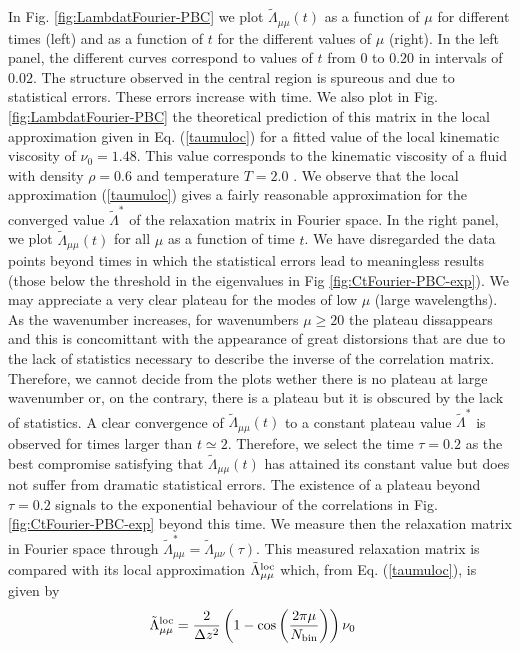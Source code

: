 \documentclass[b5paper,openright,11pt]{book}
\newcommand{\Pendiente}[1]{{\color{green}#1}} %
\begin{document}
In       Fig.         \ref{fig:LambdatFourier-PBC}       we       plot
$\tilde{\Lambda}_{\mu\mu}(t)$  as a  function of  $\mu$ for  different
times (left) and as a function of $t$ for the different values of $\mu$
(right). In the left panel,  the different curves correspond to values
of  $t$ from  $0$ to  $0.20$ in  intervals of  $0.02$.  The  structure
observed  in the  central region  is spureous  and due  to statistical
errors.   These   errors  increase  with   time.   We  also   plot  in
Fig. \ref{fig:LambdatFourier-PBC}  the theoretical prediction  of this
matrix in the local approximation  given in Eq. (\ref{taumuloc}) for a
fitted value  of the  local kinematic  viscosity of  $\nu_0=1.48$. \Pendiente{This value corresponds to the kinematic viscosity of a fluid with density $\rho=0.6$ and temperature $T=2.0$ \cite{Woodcock2006}}.  We
observe that  the local approximation (\ref{taumuloc})  gives a fairly
reasonable approximation  for the converged  value $\tilde{\Lambda}^*$
of the  relaxation matrix in Fourier  space.  In the right  panel, we
plot $\tilde{\Lambda}_{\mu\mu}(t)$ for all $\mu$ as a function of time
$t$.  We  have disregarded the data  points beyond times in  which the
statistical  errors  lead  to  meaningless results  (those  below  the
threshold  in  the  eigenvalues  in Fig  \ref{fig:CtFourier-PBC-exp}).   We  may
appreciate a  very clear  plateau for  the modes  of low  $\mu$ (large
wavelengths).  As the wavenumber increases, for wavenumbers $\mu\ge20$
the plateau dissappears  and this is concomittant  with the appearance
of great distorsions that are due  to the lack of statistics necessary
to describe  the inverse  of the correlation matrix.  Therefore, we  cannot decide
from the plots  wether there is no plateau at  large wavenumber or, on
the contrary,  there is a  plateau but it is  obscured by the  lack of
statistics.  A clear convergence of $\tilde{\Lambda}_{\mu\mu}(t)$ to a
constant  plateau  value  $\tilde{\Lambda}^*$ is  observed  for  times
larger than $t\simeq  2$. Therefore, we select the  time $\tau=0.2$ as
the best compromise  satisfying that $\tilde{\Lambda}_{\mu\mu}(t)$ has
attained  its  constant  value  but  does  not  suffer  from  dramatic
statistical errors.     The existence  of a  plateau
beyond  $\tau=0.2$  signals  to   the  exponential  behaviour  of  the
correlations  in  Fig.   \ref{fig:CtFourier-PBC-exp}  beyond  this  time.   We
measure  then   the  relaxation   matrix  in  Fourier   space  through
$\tilde{\Lambda}^*_{\mu\mu}=\tilde{\Lambda}_{\mu\nu}(\tau)$.      This
measured relaxation  matrix is  compared with its  local approximation
$\tilde{\Lambda}^{\rm loc}_{\mu\mu}$ which, from Eq. (\ref{taumuloc}),
is given by
\begin{align}
\tilde{\Lambda}^{\rm loc}_{\mu\mu}&=\frac{2}{\Delta z^2}
\left(1-\cos\left( \frac{2\pi \mu}{N_{\rm bin}}\right)\right)
\nu_0
\label{Lambdaloc}
\end{align}
\end{document}
